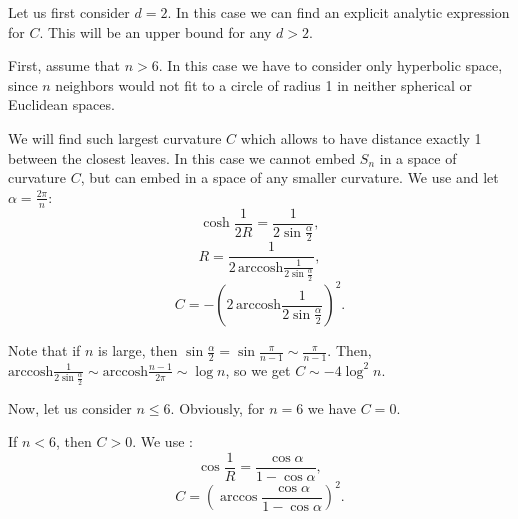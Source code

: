 \documentclass{article} %
\begin{document}
Let us first consider $d = 2$. In this case we can find an explicit analytic expression for $C$. This will be an upper bound for any $d>2$.

First, assume that $n > 6$. In this case we have to consider only hyperbolic space, since $n$ neighbors would not fit to a circle of radius 1 in neither spherical or Euclidean spaces.

We will find such largest curvature $C$ which allows to have distance exactly 1 between the closest leaves. In this case we cannot embed $S_n$ in a space of curvature $C$, but can embed in a space of any smaller curvature. 
We use  and let $\alpha = \frac{2\pi}{n}$:
\[
\cosh\frac{1}{2R} = \frac{1}{2\sin \frac{\alpha}{2}},
\]
\[
R = \frac{1}{2\,\textrm{arccosh}\frac{1}{2\sin \frac{\alpha}{2}}},
\]
\[
C = - \left(2\,\textrm{arccosh}\frac{1}{2\sin \frac{\alpha}{2}}\right)^2.
\]

Note that if $n$ is large, then $\sin \frac{\alpha}{2} = \sin\frac{\pi}{n-1} \sim \frac{\pi}{n-1}$. Then,  $\textrm{arccosh}\frac{1}{2\sin \frac{\alpha}{2}} \sim \textrm{arccosh}\frac{n-1}{2\pi} \sim \log n$, so we get $C \sim - 4 \log^2 n$. 

Now, let us consider $n \le 6$. Obviously, for $n = 6$ we have $C = 0$.

If $n < 6$, then $C > 0$. We use :
\[
\cos{\frac{1}{R}} = \frac{\cos \alpha}{1 - \cos \alpha},
\]
\[
C = \left(\arccos \frac{\cos \alpha}{1 - \cos \alpha}\right)^2.
\]



\end{document}
